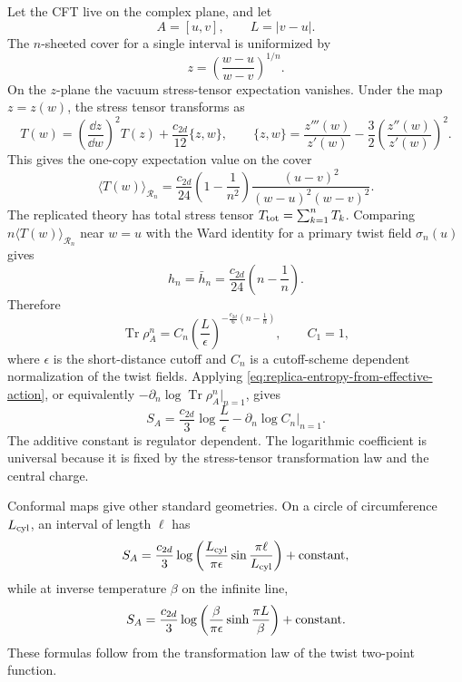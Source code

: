 Let the CFT live on the complex plane, and let
\[
  A=[u,v],\qquad L=|v-u|.
\]
The \(n\)-sheeted cover for a single interval is uniformized by
\[
  z
  =
  \left(\frac{w-u}{w-v}\right)^{1/n}.
\]
On the \(z\)-plane the vacuum stress-tensor expectation vanishes.  Under the
map \(z=z(w)\), the stress tensor transforms as
\[
  T(w)
  =
  \left(\frac{\dd z}{\dd w}\right)^2 T(z)
  +
  \frac{c_{2d}}{12}\{z,w\},
  \qquad
  \{z,w\}
  =
  \frac{z'''(w)}{z'(w)}
  -\frac32
  \left(\frac{z''(w)}{z'(w)}\right)^2 .
\]
This gives the one-copy expectation value on the cover
\begin{equation}
  \langle T(w)\rangle_{\mathcal R_n}
  =
  \frac{c_{2d}}{24}
  \left(1-\frac1{n^2}\right)
  \frac{(u-v)^2}{(w-u)^2(w-v)^2}.
  \label{eq:interval-cover-stress-expectation}
\end{equation}
The replicated theory has total stress tensor
\(T_{\rm tot}=\sum_{k=1}^nT_k\).  Comparing
\(n\langle T(w)\rangle_{\mathcal R_n}\) near \(w=u\) with the Ward identity
for a primary twist field \(\sigma_n(u)\) gives
\begin{equation}
  h_n=\bar h_n
  =
  \frac{c_{2d}}{24}
  \left(n-\frac1n\right).
  \label{eq:twist-field-dimension}
\end{equation}
Therefore
\begin{equation}
  \operatorname{Tr}\rho_A^n
  =
  C_n
  \left(\frac{L}{\epsilon}\right)^{
  -\frac{c_{2d}}{6}(n-\frac1n)}
  ,
  \qquad
  C_1=1,
  \label{eq:interval-renyi-trace}
\end{equation}
where \(\epsilon\) is the short-distance cutoff and \(C_n\) is a
cutoff-scheme dependent normalization of the twist fields.  Applying
\eqref{eq:replica-entropy-from-effective-action}, or equivalently
\(-\partial_n\log\operatorname{Tr}\rho_A^n|_{n=1}\), gives
\begin{equation}
  S_A
  =
  \frac{c_{2d}}{3}\log\frac{L}{\epsilon}
  -
  \left.\partial_n\log C_n\right|_{n=1}.
  \label{eq:two-dimensional-interval-entanglement}
\end{equation}
The additive constant is regulator dependent.  The logarithmic coefficient is
universal because it is fixed by the stress-tensor transformation law and the
central charge.

Conformal maps give other standard geometries.  On a circle of circumference
\(L_{\rm cyl}\), an interval of length \(\ell\) has
\[
  S_A
  =
  \frac{c_{2d}}{3}
  \log\left(
    \frac{L_{\rm cyl}}{\pi\epsilon}
    \sin\frac{\pi\ell}{L_{\rm cyl}}
  \right)
  +\hbox{constant},
\]
while at inverse temperature \(\beta\) on the infinite line,
\[
  S_A
  =
  \frac{c_{2d}}{3}
  \log\left(
    \frac{\beta}{\pi\epsilon}
    \sinh\frac{\pi L}{\beta}
  \right)
  +\hbox{constant}.
\]
These formulas follow from the transformation law of the twist two-point
function.


